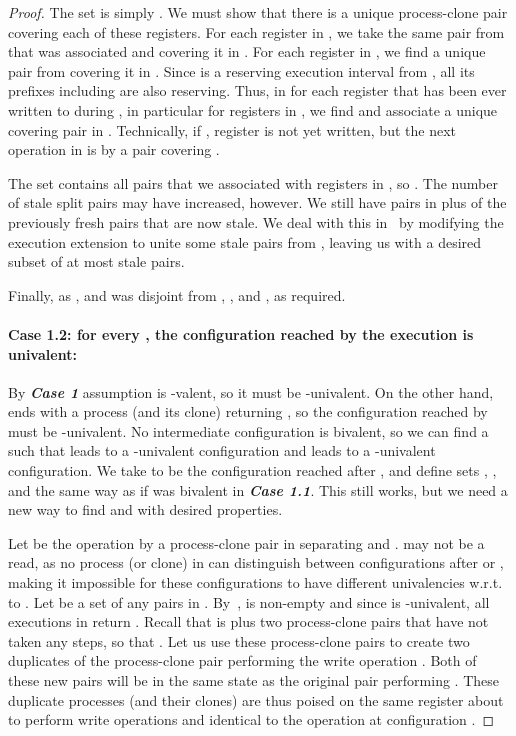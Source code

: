 \begin{proof}
The set  is simply . 	
We must show that there is a unique process-clone pair covering each of these registers.
For each register in , we take the same pair from  that was associated and covering it in .
For each register in , 
  we find a unique pair from  covering it in .
Since  is a reserving execution interval from , 
  all its prefixes including  are also reserving.
Thus, in  for each register that has been ever written to during , 
  in particular for registers in , 
  we find and associate a unique covering pair in .
Technically, if , register  is not yet written, 
  but the next operation in  is  by a pair covering .

The set  contains all  pairs that we associated with registers in , so .
The number of stale split pairs may have increased, however.
We still have pairs in  plus  of the previously fresh pairs that are now stale.
We deal with this in~ by modifying the execution extension to unite some stale pairs from , 
  leaving us with a desired subset  of at most  stale pairs.

Finally, as , and  was disjoint from , ,  and ,
   as required.

\paragraph{Case 1.2: for every , 
  the configuration reached by the execution  is univalent:}
By \emph{\textbf{Case 1}} assumption  is -valent, 
  so it must be -univalent.
On the other hand,  ends with a process (and its clone) returning , 
  so the configuration reached by  must be -univalent.
No intermediate configuration is bivalent, so we can find a  such that 
   leads to a -univalent configuration and 
   leads to a -univalent configuration. 
We take  to be the configuration reached after ,
  and define sets , ,  and  the same way as if  was bivalent in \emph{\textbf{Case 1.1}}.
This still works, but we need a new way to find  and  with desired properties.

Let  be the operation by a process-clone pair in  separating  and .
 may not be a read, as no process (or clone) in  can distinguish between configurations 
  after  or ,
  making it impossible for these configurations to have different univalencies w.r.t. to .
Let  be a set of any  pairs in . 
By~,  is non-empty and since  is -univalent,
  all executions in  return .
Recall that  is  plus two process-clone pairs that have not taken any steps,
  so that . 
Let us use these process-clone pairs to create two duplicates of the process-clone pair performing the write operation .
Both of these new pairs will be in the same state as the original pair performing .
These duplicate processes (and their clones) are thus poised on the same register about to perform 
  write operations  and  identical to the operation  at configuration . 


\end{proof}
